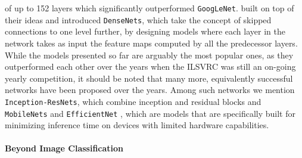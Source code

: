 of up to 152 layers which significantly outperformed \texttt{GoogLeNet}. \citet{huang2017densely} built on top of their ideas and introduced \texttt{DenseNets}, which take the concept of skipped connections to one level further, by designing models where each layer in the network takes as input the feature maps computed by all the predecessor layers. While the models presented so far are arguably the most popular ones, as they outperformed each other over the years when the ILSVRC was still an on-going yearly competition, it should be noted that many more, equivalently successful networks have been proposed over the years. Among such networks we mention \texttt{Inception-ResNets}, which combine inception and residual blocks \cite{szegedy2017inception} and \texttt{MobileNets} \cite{sandler2018mobilenetv2, howard2019searching} and \texttt{EfficientNet} \cite{tan2019efficientnet,}, which are models that are specifically built for minimizing inference time on devices with limited hardware capabilities. 

\paragraph{Beyond Image Classification}

